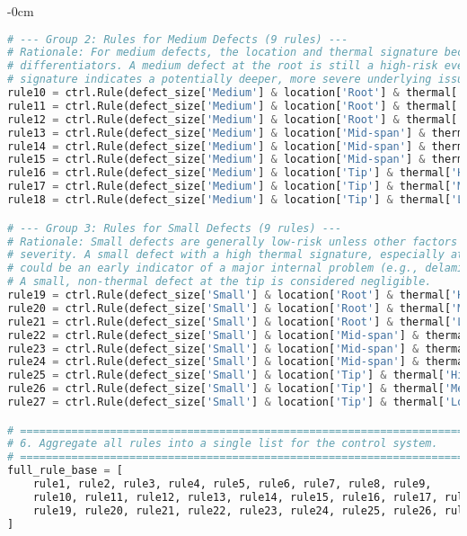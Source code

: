 \documentclass[energies,supfile,submit,pdftex,moreauthors]{Definitions/mdpi}
\begin{document}
\begin{listing}[H]
\begin{adjustwidth}{-\extralength}{0cm}
\begin{lstlisting}[language=Python, style=mystyle]
# --- Group 2: Rules for Medium Defects (9 rules) ---
# Rationale: For medium defects, the location and thermal signature become the key
# differentiators. A medium defect at the root is still a high-risk event. A thermal
# signature indicates a potentially deeper, more severe underlying issue.
rule10 = ctrl.Rule(defect_size['Medium'] & location['Root'] & thermal['High'], criticality['Severe'])
rule11 = ctrl.Rule(defect_size['Medium'] & location['Root'] & thermal['Medium'], criticality['High'])
rule12 = ctrl.Rule(defect_size['Medium'] & location['Root'] & thermal['Low'], criticality['High'])
rule13 = ctrl.Rule(defect_size['Medium'] & location['Mid-span'] & thermal['High'], criticality['High'])
rule14 = ctrl.Rule(defect_size['Medium'] & location['Mid-span'] & thermal['Medium'], criticality['Medium'])
rule15 = ctrl.Rule(defect_size['Medium'] & location['Mid-span'] & thermal['Low'], criticality['Low'])
rule16 = ctrl.Rule(defect_size['Medium'] & location['Tip'] & thermal['High'], criticality['Medium'])
rule17 = ctrl.Rule(defect_size['Medium'] & location['Tip'] & thermal['Medium'], criticality['Low'])
rule18 = ctrl.Rule(defect_size['Medium'] & location['Tip'] & thermal['Low'], criticality['Low'])

# --- Group 3: Rules for Small Defects (9 rules) ---
# Rationale: Small defects are generally low-risk unless other factors elevate their
# severity. A small defect with a high thermal signature, especially at the root,
# could be an early indicator of a major internal problem (e.g., delamination).
# A small, non-thermal defect at the tip is considered negligible.
rule19 = ctrl.Rule(defect_size['Small'] & location['Root'] & thermal['High'], criticality['High'])
rule20 = ctrl.Rule(defect_size['Small'] & location['Root'] & thermal['Medium'], criticality['Medium'])
rule21 = ctrl.Rule(defect_size['Small'] & location['Root'] & thermal['Low'], criticality['Low'])
rule22 = ctrl.Rule(defect_size['Small'] & location['Mid-span'] & thermal['High'], criticality['Medium'])
rule23 = ctrl.Rule(defect_size['Small'] & location['Mid-span'] & thermal['Medium'], criticality['Low'])
rule24 = ctrl.Rule(defect_size['Small'] & location['Mid-span'] & thermal['Low'], criticality['Negligible'])
rule25 = ctrl.Rule(defect_size['Small'] & location['Tip'] & thermal['High'], criticality['Low'])
rule26 = ctrl.Rule(defect_size['Small'] & location['Tip'] & thermal['Medium'], criticality['Negligible'])
rule27 = ctrl.Rule(defect_size['Small'] & location['Tip'] & thermal['Low'], criticality['Negligible'])

# =============================================================================
# 6. Aggregate all rules into a single list for the control system.
# =============================================================================
full_rule_base = [
    rule1, rule2, rule3, rule4, rule5, rule6, rule7, rule8, rule9, 
    rule10, rule11, rule12, rule13, rule14, rule15, rule16, rule17, rule18, 
    rule19, rule20, rule21, rule22, rule23, rule24, rule25, rule26, rule27
]
\end{lstlisting}
\end{adjustwidth}
\end{listing}
\end{document}

